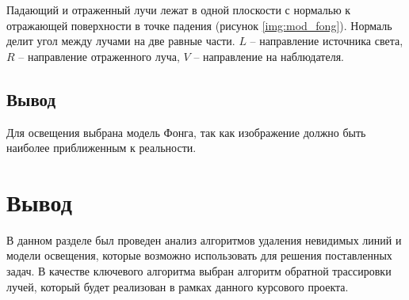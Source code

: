 Падающий и отраженный лучи лежат в одной плоскости с нормалью к отражающей поверхности в точке падения (рисунок \ref{img:mod_fong}). Нормаль делит угол между лучами на две равные части. $L$ – направление источника света, $R$ – направление отраженного луча, $V$ – направление на наблюдателя.

\subsection{Вывод}
Для освещения выбрана модель Фонга, так как изображение должно быть наиболее приближенным к реальности.

\section{Вывод}
В данном разделе был проведен анализ алгоритмов удаления невидимых линий и модели освещения, которые возможно использовать для решения поставленных задач. В качестве ключевого алгоритма выбран алгоритм обратной трассировки лучей, который будет реализован в рамках данного курсового проекта.

